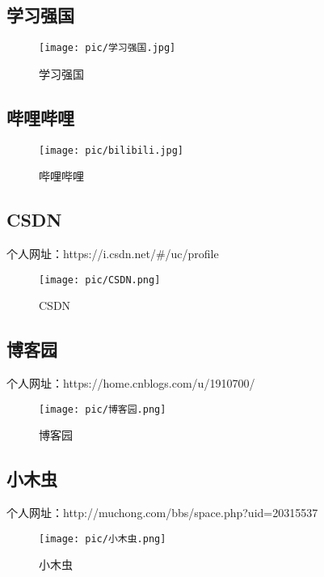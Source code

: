 \documentclass{article}
\begin{document}
\subsection{学习强国}
    \begin{figure}[!h]
    	\begin{center}
    		\texttt{[image: pic/学习强国.jpg]}
    		\caption{学习强国}
    	\end{center}
    \end{figure}


\subsection{哔哩哔哩} 
    \begin{figure}[!h]
    	\begin{center}
    		\texttt{[image: pic/bilibili.jpg]}
    		\caption{哔哩哔哩}
    	\end{center}
    \end{figure}


\subsection{CSDN}
\quad 个人网址：https://i.csdn.net/\#/uc/profile
    \begin{figure}[!h]
    	\begin{center}
    		\texttt{[image: pic/CSDN.png]}
    		\caption{CSDN}
    	\end{center}
    \end{figure}
    
    
    
    
\subsection{博客园}
\quad 个人网址：https://home.cnblogs.com/u/1910700/
    \begin{figure}[!h]
    	\begin{center}
    		\texttt{[image: pic/博客园.png]}
    		\caption{博客园}
    	\end{center}
    \end{figure}
    
    
    
\subsection{小木虫}
\quad 个人网址：http://muchong.com/bbs/space.php?uid=20315537
    \begin{figure}[!h]
    	\begin{center}
    		\texttt{[image: pic/小木虫.png]}
    		\caption{小木虫}
    	\end{center}
    \end{figure}
    
\end{document}
